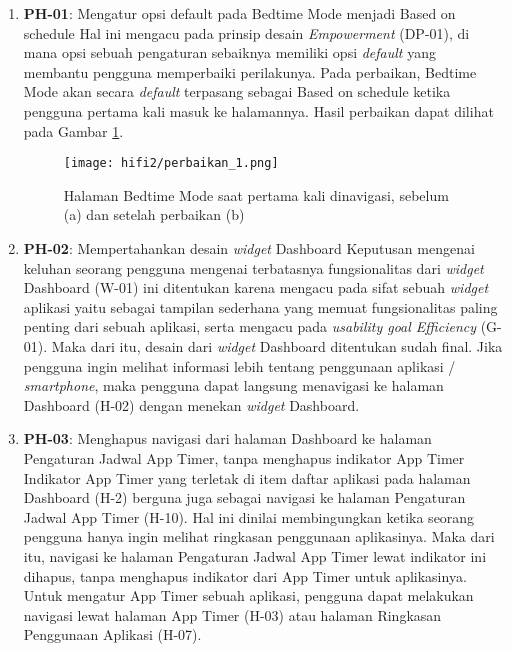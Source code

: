 \begin{enumerate}
  \item \textbf{PH-01}: Mengatur opsi default pada Bedtime Mode menjadi Based on schedule
  \subitem Hal ini mengacu pada prinsip desain \textit{Empowerment} (DP-01), di mana opsi sebuah pengaturan sebaiknya memiliki opsi \textit{default} yang membantu pengguna memperbaiki perilakunya. Pada perbaikan, Bedtime Mode akan secara \textit{default} terpasang sebagai Based on schedule ketika pengguna pertama kali masuk ke halamannya. Hasil perbaikan dapat dilihat pada Gambar \ref{img:perbaikan_1}.
  
  \begin{figure}[h]
    \centering
    \texttt{[image: hifi2/perbaikan\_1.png]}
    \caption{Halaman Bedtime Mode saat pertama kali dinavigasi, sebelum (a) dan setelah perbaikan (b)}
    \label{img:perbaikan_1}
  \end{figure}
  \FloatBarrier

  
  \item \textbf{PH-02}: Mempertahankan desain \textit{widget} Dashboard
  \subitem Keputusan mengenai keluhan seorang pengguna mengenai terbatasnya fungsionalitas dari \textit{widget} Dashboard (W-01) ini ditentukan karena mengacu pada sifat sebuah \textit{widget} aplikasi yaitu sebagai tampilan sederhana yang memuat fungsionalitas paling penting dari sebuah aplikasi, serta mengacu pada \textit{usability goal Efficiency} (G-01). Maka dari itu, desain dari \textit{widget} Dashboard ditentukan sudah final. Jika pengguna ingin melihat informasi lebih tentang penggunaan aplikasi / \textit{smartphone}, maka pengguna dapat langsung menavigasi ke halaman Dashboard (H-02) dengan menekan \textit{widget} Dashboard.  

  \item \textbf{PH-03}: Menghapus navigasi dari halaman Dashboard ke halaman Pengaturan Jadwal App Timer, tanpa menghapus indikator App Timer
  \subitem Indikator App Timer yang terletak di item daftar aplikasi pada halaman Dashboard (H-2) berguna juga sebagai navigasi ke halaman Pengaturan Jadwal App Timer (H-10). Hal ini dinilai membingungkan ketika seorang pengguna hanya ingin melihat ringkasan penggunaan aplikasinya. Maka dari itu, navigasi ke halaman Pengaturan Jadwal App Timer lewat indikator ini dihapus, tanpa menghapus indikator dari App Timer untuk aplikasinya. Untuk mengatur App Timer sebuah aplikasi, pengguna dapat melakukan navigasi lewat halaman App Timer (H-03) atau halaman Ringkasan Penggunaan Aplikasi (H-07).


\end{enumerate}
